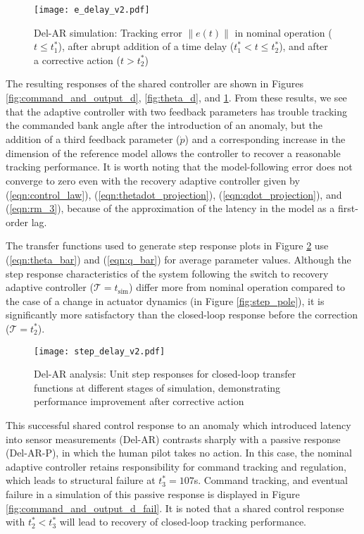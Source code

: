 \begin{figure}[h!]
	\centering
	\texttt{[image: e\_delay\_v2.pdf]}
	\caption{Del-AR simulation: Tracking error $\|e(t)\|$ in nominal operation ($t \leq t_1^*$), after abrupt addition of a time delay ($t_1^* < t \leq t_2^*$), and after a corrective action ($t > t_2^*$)}
	\label{fig:error_d}
\end{figure}

The resulting responses of the shared controller are shown in Figures \ref{fig:command_and_output_d}, \ref{fig:theta_d}, and \ref{fig:error_d}. From these results, we see that the adaptive controller with two feedback parameters has trouble tracking the commanded bank angle after the introduction of an anomaly, but the addition of a third feedback parameter ($\hat{\dot{p}}$) and a corresponding increase in the dimension of the reference model allows the controller to recover a reasonable tracking performance. It is worth noting that the model-following error does not converge to zero even with the recovery adaptive controller given by (\ref{eqn:control_law}), (\ref{eqn:thetadot_projection}), (\ref{eqn:qdot_projection}), and (\ref{eqn:rm_3}), because of the approximation of the latency in the model as a first-order lag. 

The transfer functions used to generate step response plots in Figure \ref{fig:step_delay} use (\ref{eqn:theta_bar}) and (\ref{eqn:q_bar}) for average parameter values. Although the step response characteristics of the system following the switch to recovery adaptive controller ($\mathcal{T} = t_{\textrm{sim}}$) differ more from nominal operation compared to the case of a change in actuator dynamics (in Figure \ref{fig:step_pole}), it is significantly more satisfactory than the closed-loop response before the correction ($\mathcal{T} = t_2^*$).

\begin{figure}[h!]
	\centering
	\texttt{[image: step\_delay\_v2.pdf]}
	\caption{Del-AR analysis: Unit step responses for closed-loop transfer functions at different stages of simulation, demonstrating performance improvement after corrective action}
	\label{fig:step_delay}
\end{figure}

This successful shared control response to an anomaly which introduced latency into sensor measurements (Del-AR) contrasts sharply with a passive response (Del-AR-P), in which the human pilot takes no action. In this case, the nominal adaptive controller retains responsibility for command tracking and regulation, which leads to structural failure at $t_3^* = 107$s. Command tracking, and eventual failure in a simulation of this passive response is displayed in Figure \ref{fig:command_and_output_d_fail}. It is noted that a shared control response with $t_2^* < t_3^*$ will lead to recovery of closed-loop tracking performance. 

